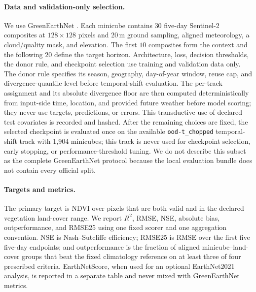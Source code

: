 \documentclass[letterpaper]{article} %
\begin{document}
\paragraph{Data and validation-only selection.}
We use GreenEarthNet \cite{benson2024multimodal}. Each minicube contains
$30$ five-day Sentinel-2 composites at $128\times128$ pixels and 20\,m ground
sampling, aligned meteorology, a cloud/quality mask, and elevation. The first
$10$ composites form the context and the following $20$ define the target
horizon. Architecture, loss, decision thresholds, the donor rule, and
checkpoint selection use training and validation data only. The donor rule
specifies its season, geography, day-of-year window, reuse cap, and
divergence-quantile level before temporal-shift evaluation. The per-track
assignment and its absolute divergence floor are then computed
deterministically from input-side time, location, and provided future weather
before model scoring; they never use targets, predictions, or errors. This
transductive use of declared test covariates is recorded and hashed. After the
remaining choices are fixed, the selected checkpoint is evaluated once on the
available \texttt{ood-t\_chopped} temporal-shift track with 1,904 minicubes;
this track is never used for checkpoint selection, early stopping, or
performance-threshold tuning. We do not describe this subset as the complete
GreenEarthNet protocol because the local evaluation bundle does not contain
every official split.

\paragraph{Targets and metrics.}
The primary target is NDVI over pixels that are both valid and in the declared
vegetation land-cover range. We report $R^2$, RMSE, NSE, absolute bias,
outperformance, and RMSE25 using one fixed scorer and one aggregation
convention. NSE is Nash--Sutcliffe efficiency; RMSE25 is RMSE over the first
five five-day endpoints; and outperformance is the fraction of aligned
minicube--land-cover groups that beat the fixed climatology reference on at
least three of four prescribed criteria. EarthNetScore, when used for an
optional EarthNet2021 analysis, is reported in a separate table and never
mixed with GreenEarthNet metrics.
\end{document}
